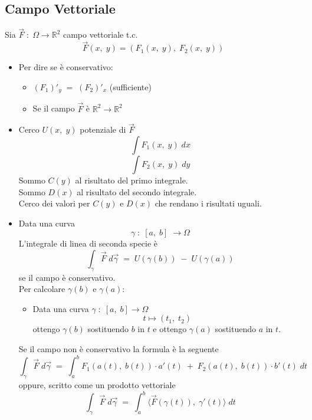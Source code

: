 \documentclass[a4paper, 10pt]{article}
\begin{document}
 				\subsection{Campo Vettoriale}
	 				Sia $ \overrightarrow{F}\; :\; \Omega \rightarrow \mathbb{R}^2 $ campo vettoriale t.c.
		 				\[
		 					\overrightarrow{F}(x,\; y) = (F_1(x,\; y),\; F_2(x,\; y))
		 				\]
	 				\begin{itemize}
	 					\item Per dire se è conservativo:
		 					\begin{itemize}
		 						\item $ (F_1)'_y\; =\; (F_2)'_x $ (sufficiente)
		 						\item Se il campo $ \overrightarrow{F} $ è $ \mathbb{R}^2 \rightarrow \mathbb{R}^2 $
		 					\end{itemize}
	 					
	 					\item Cerco $ U(x,\; y) $ potenziale di $ \overrightarrow{F} $
		 					\[
		 						\int{F_1(x,\; y)}\; dx
		 					\]
		 					\[
		 						\int{F_2(x,\; y)}\; dy
		 					\]
		 					Sommo $ C(y) $ al risultato del primo integrale.\\
		 					Sommo $ D(x) $ al risultato del secondo integrale.\\
		 					Cerco dei valori per $ C(y) $ e $ D(x) $ che rendano i risultati uguali.
		 					
	 					\item Data una curva
		 					\[
		 						\gamma\; :\; [a,\; b]\; \rightarrow \Omega
		 					\]
		 					L'integrale di linea di seconda specie è
		 					\[
		 						\int_{\gamma}^{ }{\overrightarrow{F}}\; d\overrightarrow{\gamma}\; =\; U(\gamma(b))\; -\; U(\gamma(a))
		 					\]
		 					se il campo è conservativo.\\
		 					
		 					Per calcolare $ \gamma(b) $ e $ \gamma(a) $:
			 					\begin{itemize}
			 						\item Data una curva $ \gamma\; :\; [a,\; b] \rightarrow \Omega $
			 						\[
			 							t \mapsto (t_1,\; t_2)
			 						\]
			 						ottengo $ \gamma(b) $ sostituendo $ b $ in $ t $ e ottengo $ \gamma(a) $ sostituendo $ a $ in $ t $.
		 						\end{itemize}
	 					Se il campo non è conservativo la formula è la seguente
		 					\[
		 						\int_{\gamma}^{ }{\overrightarrow{F}}\; d\overrightarrow{\gamma}\; =\; \int_{a}^{b}{F_1(a(t),\; b(t))\cdot a'(t)\; +\; F_2(a(t),\; b(t))\cdot b'(t)}\; dt
		 					\]
		 				oppure, scritto come un prodotto vettoriale
		 					\[
		 						\int_{\gamma}^{ }{\overrightarrow{F}}\; d\overrightarrow{\gamma}\; =\; \int_{a}^{b}{\langle \overrightarrow{F}(\gamma(t)),\; \gamma'(t) \rangle}\; dt
		 					\]					 						
 					\end{itemize}	
 						
\end{document}
